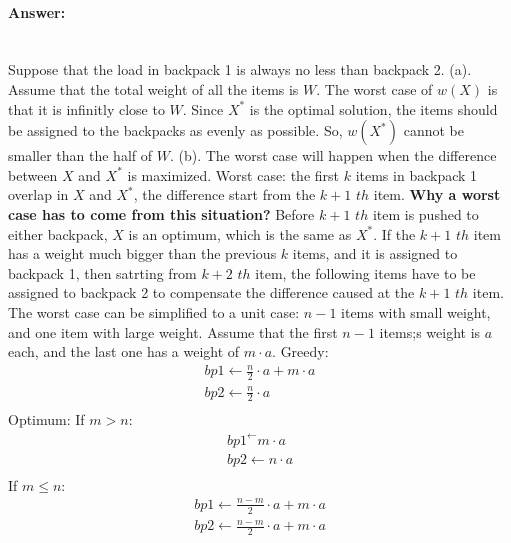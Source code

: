 \documentclass[11pt]{article}
\newcommand{\Greedy}{\mbox{\sc Greedy}}
\newcommand{\Optimum}{\mbox{\sc Optimum}}
\begin{document}
\paragraph{Answer:}\mbox{} \\
Suppose that the load in backpack 1 is always no less than backpack 2.\newline
(a). Assume that the total weight of all the items is $W$. The worst case of $w(X)$ is that it is infinitly close to $W$. Since $X^\ast$ is the optimal solution, the items should be assigned to the backpacks as evenly as possible. So, $w(X^\ast)$ cannot be smaller than the half of $W$.
\newline
(b). The worst case will happen when the difference between $X$ and $X^\ast$ is maximized. Worst case: the first $k$ items in backpack 1 overlap in $X$ and $X^\ast$, the difference start from the $k+1$ $th$ item. \newline
\textbf{Why a worst case has to come from this situation?}\newline
Before $k+1$ $th$ item is pushed to either backpack, $X$ is an optimum, which is the same as $X^\ast$. If the $k+1$ $th$ item has a weight much bigger than the previous $k$ items, and it is assigned to backpack 1, then satrting from $k+2$ $th$ item, the following items have to be assigned to backpack 2 to compensate the difference caused at the $k+1$ $th$ item.
The worst case can be simplified to a unit case: $n-1$ items with small weight, and one item with large weight. Assume that the first $n-1$ items;s weight is $a$ each, and the last one has a weight of $m \cdot a$. \newline
{\Greedy}:
\begin{gather*}
    bp1 \gets \frac{n}{2} \cdot a + m \cdot a   \\
    bp2 \gets \frac{n}{2} \cdot a               \\
\end{gather*}
{\Optimum}:\newline
If $m > n$:
\begin{gather*}
    bp1^ \gets m \cdot a                     \\
    bp2 \gets n \cdot a                     \\
\end{gather*}
If $m \leq n$:
\begin{gather*}
    bp1 \gets \frac{n-m}{2} \cdot a + m \cdot a   \\
    bp2 \gets \frac{n-m}{2} \cdot a + m \cdot a   \\
\end{gather*}
\end{document}
